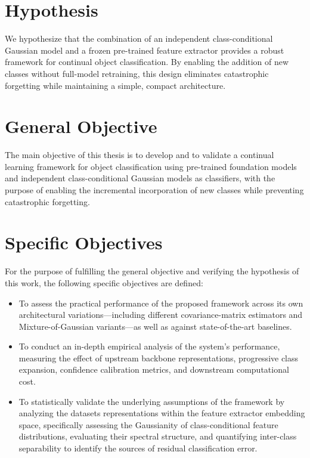 \section{Hypothesis}

We hypothesize that the combination of an independent class-conditional Gaussian model and a frozen pre-trained feature extractor provides a robust framework for continual object classification. By enabling the addition of new classes without full-model retraining, this design eliminates catastrophic forgetting while maintaining a simple, compact architecture.

\section{General Objective}

The main objective of this thesis is to develop and to validate a continual learning framework for object classification using pre-trained foundation models and independent class-conditional Gaussian models as classifiers, with the purpose of enabling the incremental incorporation of new classes while preventing catastrophic forgetting.

\section{Specific Objectives}

For the purpose of fulfilling the general objective and verifying the hypothesis of this work, the following specific objectives are defined:

\begin{itemize}

	\item To assess the practical performance of the proposed framework across its own architectural variations—including different covariance-matrix estimators and Mixture-of-Gaussian variants—as well as against state-of-the-art baselines.
	
	\item To conduct an in-depth empirical analysis of the system's performance, measuring the effect of upstream backbone representations, progressive class expansion, confidence calibration metrics, and downstream computational cost.
	
	\item To statistically validate the underlying assumptions of the framework by analyzing the datasets representations within the feature extractor embedding space, specifically assessing the Gaussianity of class-conditional feature distributions, evaluating their spectral structure, and quantifying inter-class separability to identify the sources of residual classification error.

\end{itemize}


